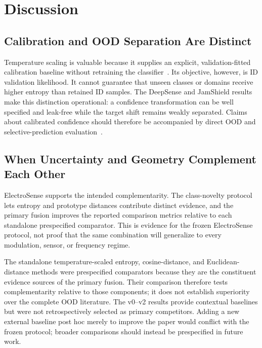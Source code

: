 \section{Discussion}
\label{sec:discussion}

\subsection{Calibration and OOD Separation Are Distinct}

Temperature scaling is valuable because it supplies an explicit, validation-fitted calibration baseline without retraining the classifier~\cite{guo2017calibration}. Its objective, however, is ID validation likelihood. It cannot guarantee that unseen classes or domains receive higher entropy than retained ID samples. The DeepSense and JamShield results make this distinction operational: a confidence transformation can be well specified and leak-free while the target shift remains weakly separated. Claims about calibrated confidence should therefore be accompanied by direct OOD and selective-prediction evaluation~\cite{elyaniv2010foundations,geifman2017selective}.

\subsection{When Uncertainty and Geometry Complement Each Other}

ElectroSense supports the intended complementarity. The class-novelty protocol lets entropy and prototype distances contribute distinct evidence, and the primary fusion improves the reported comparison metrics relative to each standalone prespecified comparator. This is evidence for the frozen ElectroSense protocol, not proof that the same combination will generalize to every modulation, sensor, or frequency regime.

The standalone temperature-scaled entropy, cosine-distance, and Euclidean-distance methods were prespecified comparators because they are the constituent evidence sources of the primary fusion. Their comparison therefore tests complementarity relative to those components; it does not establish superiority over the complete OOD literature. The v0--v2 results provide contextual baselines but were not retrospectively selected as primary competitors. Adding a new external baseline post hoc merely to improve the paper would conflict with the frozen protocol; broader comparisons should instead be prespecified in future work.

